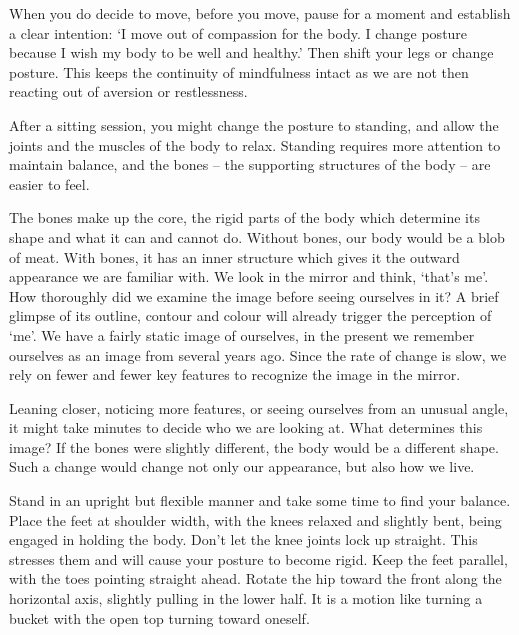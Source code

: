 When you do decide to move, before you move, pause for a moment and
establish a clear intention: `I move out of compassion for the body. I
change posture because I wish my body to be well and healthy.' Then
shift your legs or change posture. This keeps the continuity of
mindfulness intact as we are not then reacting out of aversion or
restlessness.


\enlargethispage*{2\baselineskip}

After a sitting session, you might change the posture to standing, and
allow the joints and the muscles of the body to relax. Standing requires
more attention to maintain balance, and the bones -- the supporting
structures of the body -- are easier to feel.

The bones make up the core, the rigid parts of the body which determine
its shape and what it can and cannot do. Without bones, our body would
be a blob of meat. With bones, it has an inner structure which gives it
the outward appearance we are familiar with. We look in the mirror and
think, `that's me'. How thoroughly did we examine the image before
seeing ourselves in it? A brief glimpse of its outline, contour and
colour will already trigger the perception of `me'. We have a fairly
static image of ourselves, in the present we remember ourselves as an
image from several years ago. Since the rate of change is slow, we rely
on fewer and fewer key features to recognize the image in the mirror.

Leaning closer, noticing more features, or seeing ourselves from an
unusual angle, it might take minutes to decide who we are looking at.
What determines this image? If the bones were slightly different, the
body would be a different shape. Such a change would change not only our
appearance, but also how we live.


Stand in an upright but flexible manner and take some time to find your
balance. Place the feet at shoulder width, with the knees relaxed and
slightly bent, being engaged in holding the body. Don't let the knee
joints lock up straight. This stresses them and will cause your posture
to become rigid. Keep the feet parallel, with the toes pointing straight
ahead. Rotate the hip toward the front along the horizontal axis,
slightly pulling in the lower half. It is a motion like turning a bucket
with the open top turning toward oneself.

